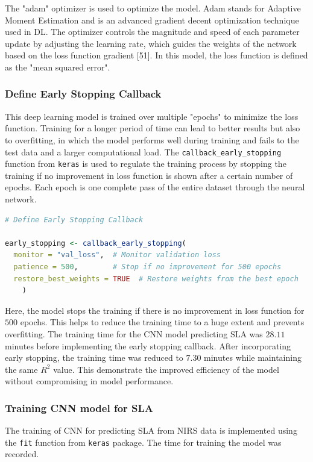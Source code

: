 \documentclass[12pt,a4paper]{report}
\begin{document}
The "adam" optimizer is used to optimize the model. Adam stands for Adaptive Moment Estimation and is an advanced gradient decent optimization technique used in DL. The optimizer controls the magnitude and speed of each parameter update by adjusting the learning rate, which guides the weights of the network based on the loss function gradient [51]. In this model, the loss function is defined as the "mean squared error". \\

\subsubsection*{Define Early Stopping Callback}
This deep learning model is trained over multiple "epochs" to minimize the loss function. Training for a longer period of time can lead to better results but also to overfitting, in which the model performs well during training and fails to the test data and a larger computational load. The \texttt{callback\_early\_stopping} function from \texttt{keras} is used to regulate the training process by stopping the training if no improvement in loss function is shown after a certain number of epochs. Each epoch is one complete pass of the entire dataset through the neural network. \\

\begin{lstlisting}[language=R, style=mystyle]
# Define Early Stopping Callback

early_stopping <- callback_early_stopping(
  monitor = "val_loss",  # Monitor validation loss
  patience = 500,        # Stop if no improvement for 500 epochs 
  restore_best_weights = TRUE  # Restore weights from the best epoch
    )
\end{lstlisting}

Here, the model stops the training if there is no improvement in loss function for $500$ epochs. This helps to reduce the training time to a huge extent and prevents overfitting. The training time for the CNN model predicting SLA was $28.11$ minutes before implementing the early stopping callback. After incorporating early stopping, the training time was reduced to $7.30$ minutes while maintaining the same $R^2$ value. This demonstrate the improved efficiency of the model without compromising in model performance. \\

\subsubsection*{Training CNN model for SLA}
The training of CNN for predicting SLA from NIRS data is implemented using the \texttt{fit} function from \texttt{keras} package. The time for training the model was recorded. \\
\end{document}
